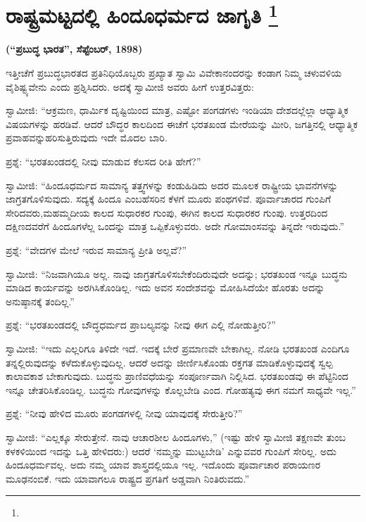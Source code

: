 
\chapter[ರಾಷ್ಟ್ರಮಟ್ಟದಲ್ಲಿ ಹಿಂದೂಧರ್ಮದ ಜಾಗೃತಿ ]{ರಾಷ್ಟ್ರಮಟ್ಟದಲ್ಲಿ ಹಿಂದೂಧರ್ಮದ ಜಾಗೃತಿ \protect\footnote{}}

\centerline{\textbf{(“ಪ್ರಬುದ್ಧ ಭಾರತ”, ಸೆಪ್ಟೆಂಬರ್​, 1898)}}

ಇತ್ತೀಚೆಗೆ ಪ್ರಬುದ್ಧಭಾರತದ ಪ್ರತಿನಿಧಿಯೊಬ್ಬರು ಪ್ರಖ್ಯಾತ ಸ್ವಾಮಿ ವಿವೇಕಾನಂದರನ್ನು ಕಂಡಾಗ ನಿಮ್ಮ ಚಳುವಳಿಯ ವೈಶಿಷ್ಟ್ಯವೇನು ಎಂದು ಪ್ರಶ್ನಿಸಿದರು. ಅದಕ್ಕೆ ಸ್ವಾಮೀಜಿ ಅವರು ಹೀಗೆ ಉತ್ತರವಿತ್ತರು:

ಸ್ವಾಮೀಜಿ: “ಆಕ್ರಮಣ, ಧಾರ್ಮಿಕ ದೃಷ್ಟಿಯಿಂದ ಮಾತ್ರ, ಎಷ್ಟೋ ಪಂಗಡಗಳು ಇಂಡಿಯಾ ದೇಶದಲ್ಲೆಲ್ಲಾ ಆಧ್ಯಾತ್ಮಿಕ ವಿಷಯಗಳನ್ನು ಹರಡಿವೆ. ಆದರೆ ಬೌದ್ಧರ ಕಾಲದಿಂದ ಈಚೆಗೆ ಭರತಖಂಡ ಮೇರೆಯನ್ನು ಮೀರಿ, ಜಗತ್ತಿನಲ್ಲಿ ಆಧ್ಯಾತ್ಮಿಕ ಪ್ರವಾಹವನ್ನು\break ಹರಿಸುತ್ತಿರುವುದು ಇದೇ ಮೊದಲ ಬಾರಿ.

ಪ್ರಶ್ನೆ: “ಭರತಖಂಡದಲ್ಲಿ ನೀವು ಮಾಡುವ ಕೆಲಸದ ರೀತಿ ಹೇಗೆ?”

ಸ್ವಾಮೀಜಿ: “ಹಿಂದೂಧರ್ಮದ ಸಾಮಾನ್ಯ ತತ್ತ್ವಗಳನ್ನು ಕಂಡುಹಿಡಿದು ಅದರ ಮೂಲಕ ರಾಷ್ಟ್ರೀಯ ಭಾವನೆಗಳನ್ನು ಜಾಗ್ರತಗೊಳಿಸುವುದು. ಸದ್ಯಕ್ಕೆ ಹಿಂದೂ ಎಂಬ\break ಹೆಸರಿನ ಕೆಳಗೆ ಮೂರು ಪಂಥಗಳಿವೆ. ಪೂರ್ವಾಚಾರದ ಗುಂಪಿಗೆ ಸೇರಿದವರು,\break ಮಹಮ್ಮದೀಯ ಕಾಲದ ಸುಧಾರಕರ ಗುಂಪು, ಈಗಿನ ಕಾಲದ ಸುಧಾರಕರ ಗುಂಪು. ಉತ್ತರದಿಂದ ದಕ್ಷಿಣದವರೆಗೆ ಹಿಂದೂಗಳೆಲ್ಲ ಒಂದನ್ನು ಮಾತ್ರ ಒಪ್ಪಿಕೊಳ್ಳುವರು. ಅದೇ ಗೋಮಾಂಸವನ್ನು ತಿನ್ನದೇ ಇರುವುದು.”

ಪ್ರಶ್ನೆ: “ವೇದಗಳ ಮೇಲೆ ಇರುವ ಸಾಮಾನ್ಯ ಪ್ರೀತಿ ಅಲ್ಲವೆ?”

ಸ್ವಾಮೀಜಿ: “ನಿಜವಾಗಿಯೂ ಅಲ್ಲ. ನಾವು ಜಾಗ್ರತಗೊಳಿಸಬೇಕೆಂದಿರುವುದೇ ಅದನ್ನು; ಭರತಖಂಡ ಇನ್ನೂ ಬುದ್ಧನು ಮಾಡಿದ ಕಾರ್ಯವನ್ನು ಅರಗಿಸಿಕೊಂಡಿಲ್ಲ. ಇದು ಅವನ ಸಂದೇಶವನ್ನು ಮೋಹಿಸಿದೆಯೇ ಹೊರತು ಅದನ್ನು ಅನುಷ್ಠಾನಕ್ಕೆ ತಂದಿಲ್ಲ.”

\vskip 5pt

ಪ್ರಶ್ನೆ: “ಭರತಖಂಡದಲ್ಲಿ ಬೌದ್ಧಧರ್ಮದ ಪ್ರಾಬಲ್ಯವನ್ನು ನೀವು ಈಗ ಎಲ್ಲಿ ನೋಡುತ್ತೀರಿ?”

\vskip 5pt

ಸ್ವಾಮೀಜಿ: “ಇದು ಎಲ್ಲರಿಗೂ ತಿಳಿದೇ ಇದೆ. ಇದಕ್ಕೆ ಬೇರೆ ಪ್ರಮಾಣವೇ ಬೇಕಾಗಿಲ್ಲ. ನೋಡಿ ಭರತಖಂಡ ಎಂದಿಗೂ ತನ್ನಲ್ಲಿರುವುದನ್ನು ಕಳೆದುಕೊಳ್ಳುವುದಿಲ್ಲ. ಆದರೆ ಅದನ್ನು ಜೀರ್ಣಿಸಿಕೊಂಡು ರಕ್ತಗತ ಮಾಡಿಕೊಳ್ಳುವುದಕ್ಕೆ ಸ್ವಲ್ಪ ಕಾಲಾವಕಾಶ ಬೇಕಾಗುವುದು. ಬುದ್ಧನು ಪ್ರಾಣಿವಧೆಯನ್ನು ಸಂಪೂರ್ಣವಾಗಿ ನಿಲ್ಲಿಸಿದ. ಭರತಖಂಡವು ಈ ಪೆಟ್ಟಿನಿಂದ ಇನ್ನೂ ಚೇತರಿಸಿಕೊಂಡಿಲ್ಲ. ಬುದ್ಧನು ಗೋವುಗಳನ್ನು ಕೊಲ್ಲಬೇಡಿ ಎಂದ. ಗೋಹತ್ಯವು ಈಗ ನಮಗೆ ಸಾಧ್ಯವೇ ಇಲ್ಲ.”

\vskip 5pt

ಪ್ರಶ್ನೆ: “ನೀವು ಹೇಳಿದ ಮೂರು ಪಂಗಡಗಳಲ್ಲಿ ನೀವು ಯಾವುದಕ್ಕೆ ಸೇರುತ್ತೀರಿ?”

\vskip 5pt

ಸ್ವಾಮೀಜಿ: “ಎಲ್ಲಕ್ಕೂ ಸೇರುತ್ತೇನೆ. ನಾವು ಆಚಾರಶೀಲ ಹಿಂದೂಗಳು,” (ಇಷ್ಟು ಹೇಳಿ ಸ್ವಾಮೀಜಿ ತಕ್ಷಣವೇ ತುಂಬ ಕಳಕಳಿಯಿಂದ ಇದನ್ನು ಒತ್ತಿ ಹೇಳಿದರು:) ಆದರೆ ‘ನಮ್ಮನ್ನು ಮುಟ್ಟಬೇಡಿ’ ಎನ್ನುವವರ ಗುಂಪಿಗೆ ಸೇರಿಲ್ಲ. ಅದು ಹಿಂದೂಧರ್ಮವಲ್ಲ. ಅದು ನಮ್ಮ ಯಾವ ಶಾಸ್ತ್ರದಲ್ಲಿಯೂ ಇಲ್ಲ. ಇದೊಂದು ಪೂರ್ವಾಚಾರ ಪರಾಯಣರ ಮೂಢನಂಬಿಕೆ. ಇದು ಯಾವಾಗಲೂ ರಾಷ್ಟ್ರದ ಪ್ರಗತಿಗೆ ಅಡ್ಡವಾಗಿ ನಿಂತಿರುವದು.”

